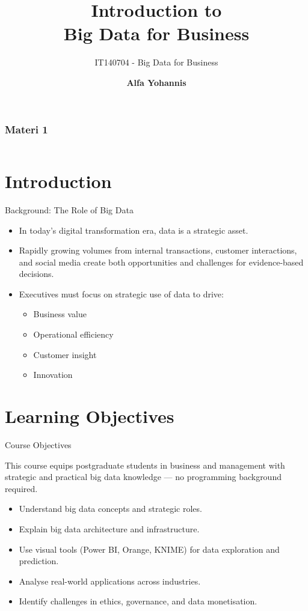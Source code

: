 \documentclass[aspectratio=169, table]{beamer}
\title{\Huge Introduction to\\
	\vspace{10pt}
	Big Data for Business}
\subtitle{IT140704 - Big Data for Business}
\author{\textbf{Alfa Yohannis}}
\begin{document}
	
	\frame{\titlepage}
	
	
	\begin{frame}[fragile]
		\frametitle{Materi 1}
		\vspace{20pt}
		\begin{columns}[t]
			\tableofcontents[sections={1-3}]
			
			\tableofcontents[sections={4-6}]
		\end{columns}
	\end{frame}



\section{Introduction}

\begin{frame}[fragile]{Background: The Role of Big Data}
	
	\begin{itemize}
		\item In today’s digital transformation era, data is a strategic asset.
		\item Rapidly growing volumes from internal transactions, customer interactions, and social media create both opportunities and challenges for evidence-based decisions.

		\item Executives must focus on strategic use of data to drive:
		\begin{itemize}
			\item Business value
			\item Operational efficiency
			\item Customer insight
			\item Innovation
		\end{itemize}
	\end{itemize}
\end{frame}


\section{Learning Objectives}

\begin{frame}[fragile]{Course Objectives}
	
	This course equips postgraduate students in business and management with strategic and practical big data knowledge — no programming background required.
	
	\vspace{4pt}
	\begin{itemize}
		\item Understand big data concepts and strategic roles.
		\item Explain big data architecture and infrastructure.
		\item Use visual tools (Power BI, Orange, KNIME) for data exploration and prediction.
		\item Analyse real-world applications across industries.
		\item Identify challenges in ethics, governance, and data monetisation.
	\end{itemize}
\end{frame}
\end{document}
